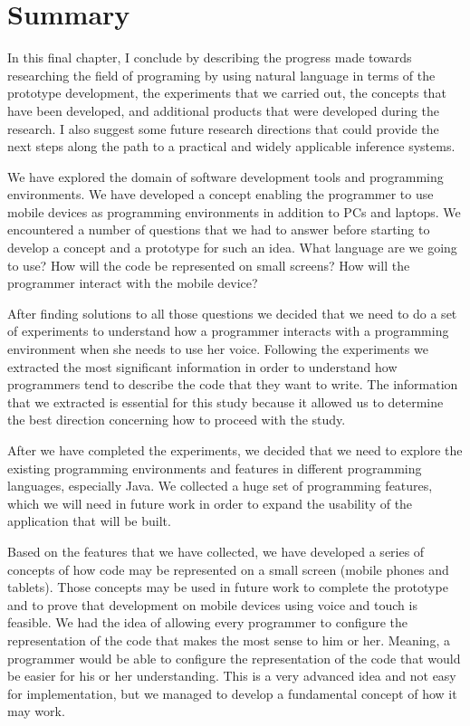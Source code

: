 \chapter{Summary}
In this final chapter, I conclude by describing the progress made towards researching the field of programing by using natural language in terms of the prototype development, the experiments that we carried out, the concepts that have been developed, and additional products that were developed during the research. I also suggest some future research directions that could provide the next steps along the path to a practical and widely applicable inference systems.

We have explored the domain of software development tools and programming environments. We have developed a concept enabling the programmer to use mobile devices as programming environments in addition to PCs and laptops. We encountered a number of questions that we had to answer before starting to develop a concept and a prototype for such an idea. What language are we going to use? How will the code be represented on small screens?  How will the programmer interact with the mobile device?

After finding solutions to all those questions we decided that we need to do a set of experiments to understand how a programmer interacts with a programming environment when she needs to use her voice. Following the experiments we extracted the most significant information in order to understand how programmers tend to describe the code that they want to write. The information that we extracted is essential for this study because it allowed us to determine the best direction concerning how to proceed with the study.

After we have completed the experiments, we decided that we need to explore the existing programming environments and features in different programming languages, especially Java. We collected a huge set of programming features, which we will need in future work in order to expand the usability of the application that will be built.

Based on the features that we have collected, we have developed a series of concepts of how code may be represented on a small screen (mobile phones and tablets). Those concepts may be used in future work to complete the prototype and to prove that development on mobile devices using voice and touch is feasible.
We had the idea of allowing every programmer to configure the representation of the code that makes the most sense to him or her. Meaning, a programmer would be able to configure the representation of the code that would be easier for his or her understanding. This is a very advanced idea and not easy for implementation, but we managed to develop a fundamental concept of how it may work.

